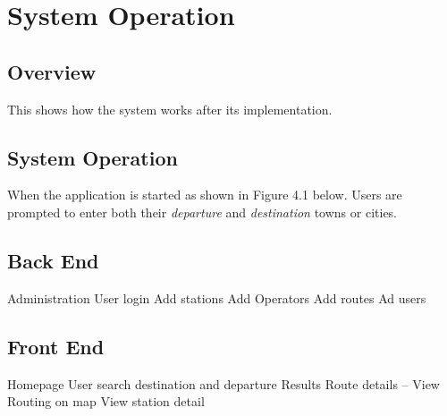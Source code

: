 
\chapter{System Operation} %



\ifpdf
    \graphicspath{{4/figures/PNG/}{4/figures/PDF/}{4/figures/}}
\else
    \graphicspath{{4/figures/EPS/}{4/figures/}}
\fi

\section{Overview}
This shows how the system works after its implementation. 

\section{System Operation}
When the application is started as shown in Figure 4.1 below. Users are prompted to enter both their \textit{departure} and \textit{destination} towns or cities.


\section{Back End}
Administration
User login
Add stations
Add Operators
Add routes
Ad users

\section{Front End}
Homepage
User search destination and departure
Results
Route details
-- View Routing on map
View station detail







